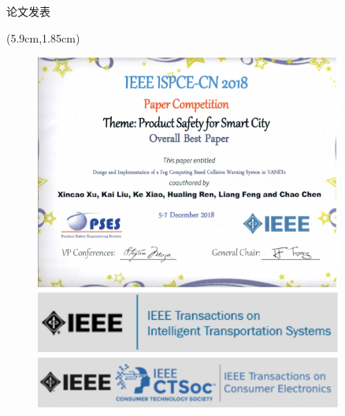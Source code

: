 \begin{frame}{论文发表}
\begin{center}
\begin{textblock*}{\textwidth}(5.9cm,1.85cm)
\begin{minipage}[t]{0.4\textwidth}
\begin{figure}
  \centering
  \includegraphics[width=0.9\textwidth]{fig/publication2.pdf}
\end{figure}
\end{minipage}
\end{textblock*}
\end{center}

\end{frame}

